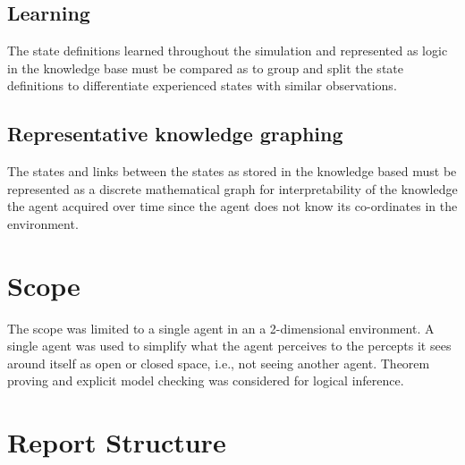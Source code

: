 \subsection{Learning}
The state definitions learned throughout the simulation and represented as logic in the knowledge base must be compared as to group and split the state definitions to differentiate experienced states with similar observations. 	
	
\subsection{Representative knowledge graphing}
The states and links between the states as stored in the knowledge based must be represented as a discrete mathematical graph for interpretability of the knowledge the agent acquired over time since the agent does not know its co-ordinates in the environment. 





\section{Scope}


The scope was limited to a single agent in an a 2-dimensional environment. A single agent was used to simplify what the agent perceives to the percepts it sees around itself as open or closed space, i.e., not seeing another agent. Theorem proving  and explicit model checking  was considered for logical inference.


\section{Report Structure}

